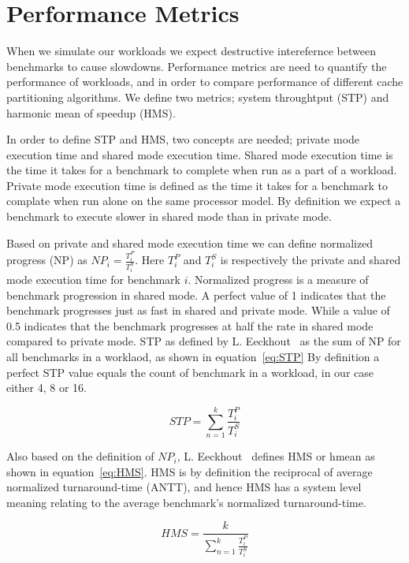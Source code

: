 \section{Performance Metrics}
\label{sec:methodology:metrics}

When we simulate our workloads we expect destructive interefernce between benchmarks to cause slowdowns.
Performance metrics are need to quantify the performance of workloads, and in order to compare performance of different cache partitioning algorithms.
We define two metrics; system throughtput (STP) and harmonic mean of speedup (HMS).

In order to define STP and HMS, two concepts are needed; private mode execution time and shared mode execution time.
Shared mode execution time is the time it takes for a benchmark to complete when run as a part of a workload.
Private mode execution time is defined as the time it takes for a benchmark to complate when run alone on the same processor model.
By definition we expect a benchmark to execute slower in shared mode than in private mode.

Based on private and shared mode execution time we can define normalized progress (NP) as $NP_i = \frac{T^{P}_i}{T^{S}_i}$.
Here $T^{P}_i$ and $T^{S}_i$ is respectively the private and shared mode execution time for benchmark $i$.
Normalized progress is a measure of benchmark progression in shared mode.
A perfect value of 1 indicates that the benchmark progresses just as fast in shared and private mode.
While a value of 0.5 indicates that the benchmark progresses at half the rate in shared mode compared to private mode.
STP as defined by L. Eeckhout~\cite{Eeckhout2010} as the sum of NP for all benchmarks in a worklaod, as shown in equation~\ref{eq:STP}
By definition a perfect STP value equals the count of benchmark in a workload, in our case either 4, 8 or 16.

\begin{equation} \label{eq:STP} 
 STP = {\sum\limits_{n=1}^{k}}\frac{T^{P}_i}{T^{S}_i}
\end{equation}

Also based on the definition of $NP_i$, L. Eeckhout~\cite{Eeckhout2010} defines HMS or hmean as shown in equation~\ref{eq:HMS}.
HMS is by definition the reciprocal of average normalized turnaround-time (ANTT), and hence HMS has a system level meaning relating to the average benchmark's normalized turnaround-time.

\begin{equation} \label{eq:HMS}
 HMS = \frac{k}{{\sum\limits_{n=1}^{k}}\frac{T^{P}_i}{T^{S}_i}}
\end{equation}


